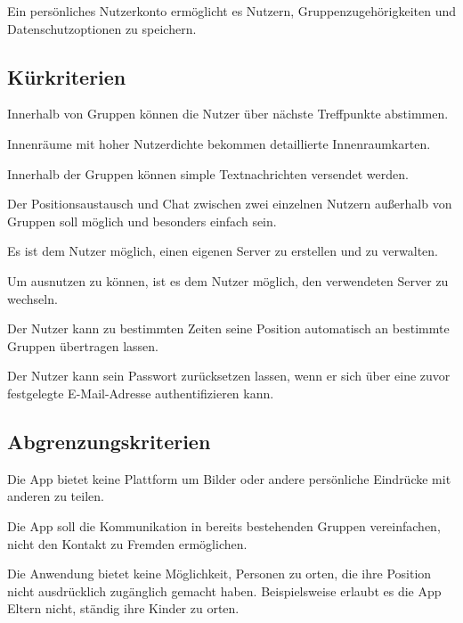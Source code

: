 \documentclass[parskip=full,11pt]{scrartcl}
\begin{document}
Ein persönliches Nutzerkonto ermöglicht es Nutzern,
Gruppenzugehörigkeiten und Datenschutzoptionen zu speichern.

\subsection{Kürkriterien}
Innerhalb von Gruppen können die Nutzer über nächste Treffpunkte abstimmen.

Innenräume mit hoher Nutzerdichte bekommen detaillierte Innenraumkarten.

Innerhalb der Gruppen können simple Textnachrichten versendet werden.

Der Positionsaustausch und Chat zwischen zwei einzelnen Nutzern außerhalb von
Gruppen soll möglich und besonders einfach sein.

Es ist dem Nutzer möglich, einen eigenen Server zu erstellen und zu verwalten.

Um  ausnutzen zu können, ist es dem Nutzer
möglich, den verwendeten Server zu wechseln.

Der Nutzer kann zu bestimmten Zeiten seine Position automatisch an bestimmte
Gruppen übertragen lassen.

Der Nutzer kann sein Passwort zurücksetzen lassen, wenn er sich über eine zuvor
festgelegte E-Mail-Adresse authentifizieren kann.

\subsection{Abgrenzungskriterien}
Die App bietet keine Plattform um Bilder oder andere persönliche Eindrücke mit
anderen zu teilen.

Die App soll die Kommunikation in bereits bestehenden Gruppen vereinfachen,
nicht den Kontakt zu Fremden ermöglichen.

Die Anwendung bietet keine Möglichkeit, Personen zu orten,
die ihre Position nicht ausdrücklich zugänglich gemacht haben.
Beispielsweise erlaubt es die App Eltern nicht, ständig ihre Kinder zu orten.
\end{document}
